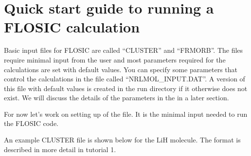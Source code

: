 \documentclass[letterpaper,10pt,english,openany,oneside]{sphinxmanual}
\begin{document}
\chapter{Quick start guide to running a FLOSIC calculation}
\label{\detokenize{docs/setupcal:quick-start-guide-to-running-a-flosic-calculation}}\label{\detokenize{docs/setupcal:setup}}\label{\detokenize{docs/setupcal::doc}}
\sphinxAtStartPar
Basic input files for FLOSIC are called “CLUSTER” and “FRMORB”.
The files require minimal input from the user and most parameters required for the calculations are set with
default values. You can specify some parameters that control the calculations in the file called “NRLMOL\_INPUT.DAT”.
A version of this file with default values is created in the run directory if it otherwise does not exist. We will
discuss the details of the parameters in the  in a later section.

\sphinxAtStartPar
For now let’s work on setting up of the  file. It is the minimal input needed to run the FLOSIC code.

\sphinxAtStartPar
An example CLUSTER file is shown below for the LiH molecule. The format is described in more detail in tutorial 1.

\begin{sphinxVerbatim}[commandchars=\\\{\}]
            
                             
                             
      
      
                       
          
\end{sphinxVerbatim}
\end{document}
